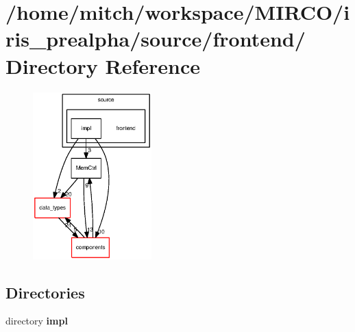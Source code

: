 \section{/home/mitch/workspace/MIRCO/iris\_\-prealpha/source/frontend/ Directory Reference}
\label{dir_eb94cf359aa949de90b0a3e30242f84a}


\nopagebreak
\begin{figure}[H]
\begin{center}
\leavevmode
\includegraphics[width=130pt]{dir_eb94cf359aa949de90b0a3e30242f84a_dep}
\end{center}
\end{figure}
\subsection*{Directories}
\begin{CompactItemize}
\item 
directory {\bf impl}
\end{CompactItemize}
